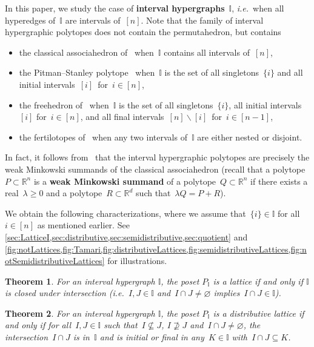 \documentclass{amsart}
\newtheorem{theoremA}{Theorem}
\theoremstyle{definition}
\newcommand{\R}{\mathbb{R}} %
\newcommand{\ssm}{\smallsetminus} %
\newcommand{\ie}{\textit{i.e.}~} %
\newcommand{\defn}[1]{\textbf{\textsf{\color{PineGreen} #1}}} %
\newcommand{\II}{\mathbb I} %
\begin{document}
In this paper, we study the case of \defn{interval hypergraphs}~$\II$, \ie when all hyperedges of~$\II$ are intervals of~$[n]$.
Note that the family of interval hypergraphic polytopes does not contain the permutahedron, but contains
\begin{itemize}
\item the classical associahedron of~\cite{ShniderSternberg,Loday} when~$\II$ contains all intervals of~$[n]$,
\item the Pitman--Stanley polytope~\cite{PitmanStanley} when~$\II$ is the set of all singletons~$\{i\}$ and all initial intervals~$[i]$~for~${i \in [n]}$,
\item the freehedron of~\cite{Saneblidze-freehedron} when~$\II$ is the set of all singletons~$\{i\}$, all initial intervals~$[i]$ for~${i \in [n]}$, and all final intervals~$[n] \ssm [i]$~for~${i \in [n-1]}$,
\item the fertilotopes of~\cite{Defant-fertilitopes} when any two intervals of~$\II$ are either nested or disjoint.
\end{itemize}
In fact, it follows from~\cite{BazierMatteChapelierLaguetDouvilleMousavandThomasYildirim,PadrolPaluPilaudPlamondon} that the interval hypergraphic polytopes are precisely the weak Minkowski summands of the classical associahedron (recall that a polytope~$P \subset \R^n$ is a \defn{weak Minkowski summand} of a polytope~$Q \subset \R^n$ if there exists a real~$\lambda \ge 0$ and a polytope~$R \subset \R^d$ such that~$\lambda Q = P + R$).

We obtain the following characterizations, where we assume that~$\{i\} \in \II$ for all~$i \in [n]$ as mentioned earlier.
See \cref{sec:LatticeI,sec:distributive,sec:semidistributive,sec:quotient} and \cref{fig:notLattices,fig:Tamari,fig:distributiveLattices,fig:semidistributiveLattices,fig:notSemidistributiveLattices} for illustrations.

\begin{theoremA}
\label{thm:latticeI}
For an interval hypergraph $\II$, the poset $P_\II$ is a lattice if and only if $\II$ is closed under intersection (\ie $I, J \in \II$ and~$I \cap J \ne \varnothing$ implies~$I \cap J \in \II$).
\end{theoremA}

\begin{theoremA}
\label{thm:distributiveLatticeI}
For an interval hypergraph $\II$, the poset $P_\II$ is a distributive lattice if and only if for all~$I, J \in \II$ such that~$I \not\subseteq J$, $I \not\supseteq J$ and~$I \cap J \ne \varnothing$, the intersection~$I \cap J$ is in~$\II$ and is initial or final in any~$K \in \II$ with~$I \cap J \subseteq K$.
\end{theoremA}
\end{document}
